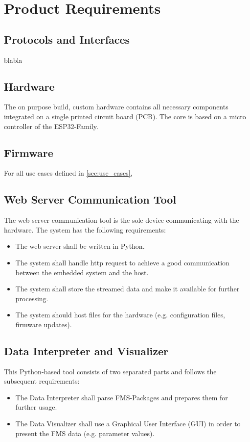 \newpage
\section{Product Requirements}
\subsection{Protocols and Interfaces}
blabla

\subsection{Hardware}
The on purpose build, custom hardware contains all necessary components integrated on a single printed circuit board (PCB).
The core is based on a micro controller of the ESP32-Family. 



\subsection{Firmware}
For all use cases defined in \cref{sec:use_cases}, 

\subsection{Web Server Communication Tool}
The web server communication tool is the sole device communicating with the hardware. The system has the following requirements:
\begin{itemize}
        \item The web server shall be written in Python.
        \item The system shall handle http request to achieve a good communication between the embedded system and the host.
        \item The system shall store the streamed data and make it available for further processing.
        \item The system should host files for the hardware (e.g. configuration files, firmware updates).
\end{itemize}

\subsection{Data Interpreter and Visualizer}
This Python-based tool consists of two separated parts and follows the subsequent requirements:

\begin{itemize}
		\item The Data Interpreter shall parse FMS-Packages and prepares them for further usage.
		\item The Data Visualizer shall use a Graphical User Interface (GUI) in order to present the FMS data (e.g. parameter values).
\end{itemize}